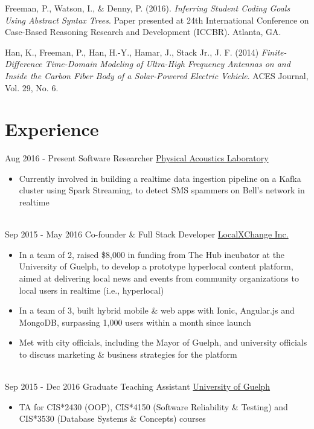 \documentclass[a4paper]{twentysecondcv} %
\begin{document}
Freeman, P., Watson, I., \& Denny, P. (2016). \emph{Inferring Student Coding
Goals Using Abstract Syntax Trees}. Paper presented at 24th International
Conference on Case-Based Reasoning Research and Development (ICCBR). Atlanta, GA.

Han, K., Freeman, P., Han, H.-Y., Hamar, J., Stack Jr., J. F. (2014)
\emph{Finite-Difference Time-Domain Modeling of Ultra-High Frequency Antennas
on and Inside the Carbon Fiber Body of a Solar-Powered Electric Vehicle}. ACES
Journal, Vol. 29, No. 6.


\section{Experience}

\begin{twenty} %
\twentyitem
    {Aug 2016 -}
    {Present}
    {Software Researcher}
    {\href{https://pal.auckland.ac.nz/}{Physical Acoustics Laboratory}}
    {}
    {\begin{itemize}
    \item Currently involved in building a realtime data ingestion pipeline on a Kafka cluster using Spark Streaming, to detect SMS spammers on Bell's network in realtime
    \end{itemize}}
        \\
        \twentyitem
        {Sep 2015 -}
        {May 2016}
        {Co-founder \& Full Stack Developer}
        {\href{http://www.localxchange.ca/}{LocalXChange Inc.}}
        {}
        {{\begin{itemize}
        \item In a team of 2, raised \$8,000 in funding from The Hub incubator at the University of Guelph, to develop a prototype hyperlocal content platform, aimed at delivering local news and events from community organizations to local users in realtime (i.e., hyperlocal)
        \item In a team of 3, built hybrid mobile \& web apps with Ionic, Angular.js and MongoDB, surpassing 1,000 users within a month since launch
        \item Met with city officials, including the Mayor of Guelph, and university officials to discuss marketing \& business strategies for the platform 
    \end{itemize}}
        } \\   
\twentyitem
       {Sep 2015 -}
        {Dec 2016}
        {Graduate Teaching Assistant}
        {\href{http://www.uoguelph.ca}{University of Guelph}}
        {}
        {{\begin{itemize}
        \item TA for CIS*2430 (OOP), CIS*4150 (Software Reliability \& Testing) and CIS*3530 (Database Systems \& Concepts) courses
    \end{itemize}}
        }
        
\end{twenty}
\end{document}
